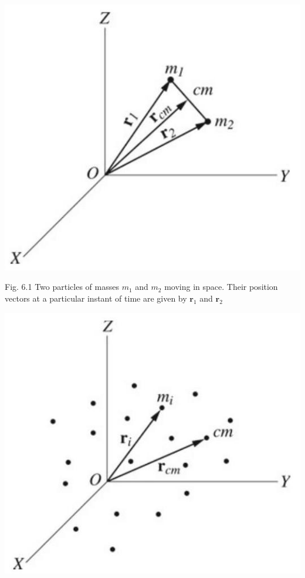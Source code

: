 \documentclass[10pt]{article}
\begin{document}
\begin{center}
\includegraphics[max width=\textwidth]{2024_09_13_db1f357d2aad0a03eb2eg-096(2)}
\end{center}

Fig. 6.1 Two particles of masses $m_{1}$ and $m_{2}$ moving in space. Their position vectors at a particular instant of time are given by $\mathbf{r}_{1}$ and $\mathbf{r}_{2}$

\begin{center}
\includegraphics[max width=\textwidth]{2024_09_13_db1f357d2aad0a03eb2eg-096}
\end{center}
\end{document}
